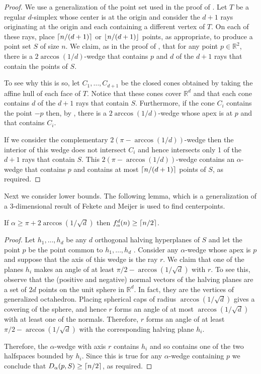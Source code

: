 \documentclass[lotsofwhite]{patmorin}
\newcommand{\R}{\mathbb{R}}
\begin{document}
\begin{proof} 
We use a generalization of the point set used in the proof of
.  Let $T$ be a regular $d$-simplex whose center is at the
origin and consider the $d+1$ rays originating at the origin and each
containing a different vertex of $T$.  On each of these rays, place
$\left\lceil n/(d+1) \right\rceil$ or $\left\lfloor n/(d+1) \right\rfloor$ points, as appropriate, to
produce a point set $S$ of size $n$.  We claim, as in the proof
of , that for any point $p\in\R^2$, there is a
$2\arccos(1/d)$-wedge that contains $p$ and $d$ of the $d+1$ rays that
contain the points of $S$. 

To see why this is so, let $C_1,\ldots,C_{d+1}$ be the closed cones
obtained by taking the affine hull of each face of $T$.  Notice that
these cones cover $\R^d$ and that each cone contains $d$ of
the $d+1$ rays that contain $S$.  Furthermore, if the cone $C_i$
contains the point $-p$ then, by , there is a
$2\arccos(1/d)$-wedge whose apex is at $p$ and that contains $C_i$.  

If we consider the complementary $2(\pi-\arccos(1/d))$-wedge then the
interior of this wedge does not intersect $C_i$ and hence intersects
only 1 of the $d+1$ rays that contain $S$. This
$2(\pi-\arccos(1/d))$-wedge contains an $\alpha$-wedge that contains $p$
and contains at most $\left\lceil n/(d+1) \right\rceil$ points of $S$, as required.
\end{proof}

Next we consider lower bounds.  The following lemma, which is a
generalization of a 3-dimensional result of Fekete and Meijer
\cite{fm00}
is used to find centerpoints.


\begin{lem}
If $\alpha \ge \pi+2\arccos(1/\sqrt{d})$ then $f_\alpha^d(n)\ge \left\lceil n/2 \right\rceil$.
\end{lem}

\begin{proof}
Let $h_1,\ldots,h_d$ be any $d$ orthogonal halving hyperplanes of $S$
and let the point $p$ be the point common to $h_1,\ldots,h_d$ .
Consider any $\alpha$-wedge whose apex is $p$ and suppose that the
axis of this wedge is the ray $r$.  We claim that one of the planes
$h_i$ makes an angle of at least $\pi/2-\arccos(1/\sqrt{d})$ with $r$.
To see this, observe that the (positive and negative) normal vectors
of the halving planes are a set of $2d$ points on the unit sphere in
$\R^d$.  In fact, they are the vertices of generalized
octahedron. Placing spherical caps of radius $\arccos(1/\sqrt{d})$
gives a covering of the sphere, and hence $r$ forms an angle of at
most $\arccos(1/\sqrt{d})$ with at least one of the normals.
Therefore, $r$ forms an angle of at least $\pi/2-\arccos(1/\sqrt{d})$
with the corresponding halving plane $h_i$.

Therefore, the $\alpha$-wedge with axis $r$ contains $h_i$ and so
contains one of the two halfspaces bounded by $h_i$.  Since this is
true for any $\alpha$-wedge containing $p$ we conclude that
$D_\alpha(p,S)\ge\left\lceil n/2 \right\rceil$, as required.  
\end{proof}
\end{document}
